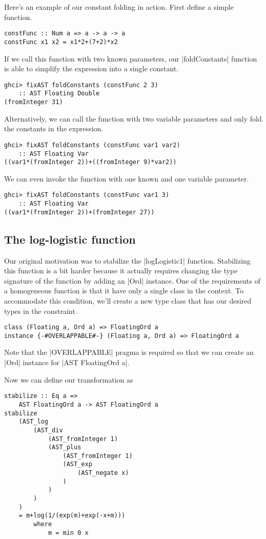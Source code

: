 \documentclass[preprint]{sigplanconf}
\theoremstyle{definition}
\begin{document}
Here's an example of our constant folding in action.
First define a simple function.
\begin{lstlisting}
constFunc :: Num a => a -> a -> a
constFunc x1 x2 = x1*2+(7+2)*x2
\end{lstlisting}
If we call this function with two known parameters,
our |foldConstants| function is able to simplify the expression into a single constant.
\begin{lstlisting}
ghci> fixAST foldConstants (constFunc 2 3)
    :: AST Floating Double
(fromInteger 31)
\end{lstlisting}
Alternatively, we can call the function with two variable parameters and only fold the constants in the expression.
\begin{lstlisting}
ghci> fixAST foldConstants (constFunc var1 var2)
    :: AST Floating Var
((var1*(fromInteger 2))+((fromInteger 9)*var2))
\end{lstlisting}
We can even invoke the function with one known and one variable parameter.
\begin{lstlisting}
ghci> fixAST foldConstants (constFunc var1 3)
    :: AST Floating Var
((var1*(fromInteger 2))+(fromInteger 27))
\end{lstlisting}

\subsection{The log-logistic function}

Our original motivation was to stabilize the |logLogistic1| function.
Stabilizing this function is a bit harder because it actually requires changing the type signature of the function by adding an |Ord| instance.
One of the requirements of a homogeneous function is that it have only a single class in the context.
To accommodate this condition, we'll create a new type class that has our desired types in the constraint.
\begin{lstlisting}
class (Floating a, Ord a) => FloatingOrd a
instance {-#OVERLAPPABLE#-} (Floating a, Ord a) => FloatingOrd a
\end{lstlisting}
Note that the |OVERLAPPABLE| pragma is required so that we can create an |Ord| instance for |AST FloatingOrd a|.

Now we can define our transformation as
\begin{lstlisting}
stabilize :: Eq a =>
    AST FloatingOrd a -> AST FloatingOrd a
stabilize
    (AST_log
        (AST_div
            (AST_fromInteger 1)
            (AST_plus
                (AST_fromInteger 1)
                (AST_exp
                    (AST_negate x)
                )
            )
        )
    )
    = m+log(1/(exp(m)+exp(-x+m)))
        where
            m = min 0 x
\end{lstlisting}
\end{document}
